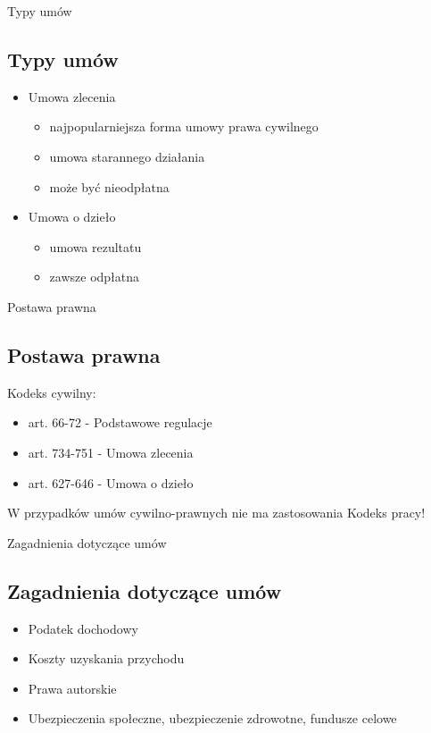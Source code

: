 \documentclass[10pt,utf8]{beamer}
\begin{document}
\begin{frame}{Typy umów}
	\subsection{Typy umów}
	\begin{itemize}
		\item Umowa zlecenia
		\begin{itemize}
			\item najpopularniejsza forma umowy prawa cywilnego
			\item umowa starannego działania
			\item może być nieodpłatna
		\end{itemize}
		\item Umowa o dzieło
		\begin{itemize}
			\item umowa rezultatu
			\item zawsze odpłatna
		\end{itemize}
	\end{itemize}
\end{frame}


\begin{frame}{Postawa prawna}
	\subsection{Postawa prawna}
	Kodeks cywilny:
	\begin{itemize}
		\item art. 66-72 - Podstawowe regulacje
		\item art. 734-751 - Umowa zlecenia
		\item art. 627-646 - Umowa o dzieło
	\end{itemize}
	\vspace{\baselineskip}
	W przypadków umów cywilno-prawnych nie ma zastosowania Kodeks pracy!
\end{frame}

\begin{frame}{Zagadnienia dotyczące umów}
	\subsection{Zagadnienia dotyczące umów}
	\begin{itemize}[]
		\item Podatek dochodowy
		\item Koszty uzyskania przychodu
		\item Prawa autorskie
		\item Ubezpieczenia społeczne, ubezpieczenie zdrowotne, fundusze celowe
	\end{itemize}
\end{frame}
\end{document}
